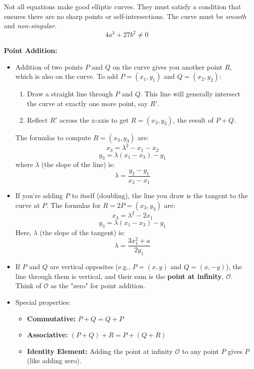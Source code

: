 Not all equations make good elliptic curves. They must satisfy a condition that ensures there are no sharp points or self-intersections. The curve must be \emph{smooth} and \emph{non-singular}.
\[ 4a^3 + 27b^2 \neq 0 \]

\textbf{Point Addition:} 
\begin{itemize}
    \item Addition of two points $P$ and $Q$ on the curve gives you another point $R$, which is also on the curve. 
            To add \( P = (x_1, y_1) \) and \( Q = (x_2, y_2) \):
            \begin{enumerate}
                \item Draw a straight line through \( P \) and \( Q \). This line will generally intersect the curve at exactly one more point, say \( R' \).
                \item Reflect \( R' \) across the x-axis to get \( R = (x_3, y_3) \), the result of \( P + Q \).
            \end{enumerate}
            The formulas to compute \( R = (x_3, y_3) \) are:
            \[
            x_3 = \lambda^2 - x_1 - x_2
            \]
            \[
            y_3 = \lambda(x_1 - x_3) - y_1
            \]
            where \( \lambda \) (the slope of the line) is:
            \[
            \lambda = \frac{y_2 - y_1}{x_2 - x_1}
            \]
    \item If you’re adding $P$ to itself (doubling), the line you draw is the tangent to the curve at $P$.
    The formulas for \( R = 2P = (x_3, y_3) \) are:
    \[
    x_3 = \lambda^2 - 2x_1
    \]
    \[
    y_3 = \lambda(x_1 - x_3) - y_1
    \]
    Here, \( \lambda \) (the slope of the tangent) is:
    \[
    \lambda = \frac{3x_1^2 + a}{2y_1}
    \]
    \item If \( P \) and \( Q \) are vertical opposites (e.g., \( P = (x, y) \) and \( Q = (x, -y) \)), the line through them is vertical, and their sum is the \textbf{point at infinity}, \( \mathcal{O} \). Think of \( \mathcal{O} \) as the "zero" for point addition.
    \item Special properties:
    \begin{itemize}
        \item \textbf{Commutative:} \( P + Q = Q + P \)
        \item \textbf{Associative:} \( (P + Q) + R = P + (Q + R) \)
        \item \textbf{Identity Element:} Adding the point at infinity \( \mathcal{O} \) to any point \( P \) gives \( P \) (like adding zero).
    \end{itemize}
\end{itemize}

